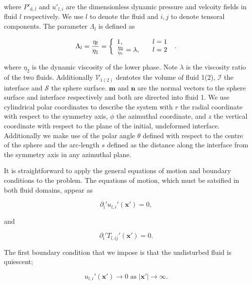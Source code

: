 \documentclass[12pt]{article}
\begin{document}
where $P'_{\text{d},l}$ and $u'_{l,i}$ are the dimensionless dynamic pressure and velcoity fields in fluid $l$ respectively. We use $l$ to denote the fluid and $i,j$ to denote tensoral components. The parameter $\Lambda_{l}$ is defined as

\begin{equation}
\label{equ:Llambda}
\Lambda_{l} = \frac{\eta_{l}}{\eta_{1}} = \left\{
    \begin{array}{l l}
      1, & \quad l = 1 \\
      \frac{\eta_{2}}{\eta_{1}} = \lambda, & \quad l = 2
    \end{array} \right.\ .
\end{equation}

where $\eta_{2}$ is the dynamic viscosity of the lower phase. Note $\lambda$ is the viscosity ratio of the two fluids. Additionally $\mathcal{V}_{1(2)}$ dentotes the volume of fluid 1(2), $\mathcal{I}$ the interface and $\mathcal{S}$ the sphere surface. $\boldsymbol{m}$ and $\boldsymbol{n}$ are the normal vectors to the sphere surface and interface respectively and both are directed into fluid 1. We use cylindrical polar coordinates to describe the system with $r$ the radial coordinate with respect to the symmetry axis, $\phi$ the azimuthal coordinate, and $z$ the vertical coordinate with respect to the plane of the initial, undeformed interface. Additionally we make use of the polar angle $\theta$ defined with respect to the centre of the sphere and the arc-length $s$ defined as the distance along the interface from the symmetry axis in any azimuthal plane.

It is straightforward to apply the general equations of motion and boundary conditions to the problem. The equations of motion, which must be satsified in both fluid domains, appear as 

\begin{equation}
\label{equ:cont}
\partial_{\text{i}}' u_{l,i}'(\boldsymbol{x'}) = 0,
\end{equation}

and 

\begin{equation}
\label{equ:stokes}
\partial_{\text{i}}' T_{l,ij}'(\boldsymbol{x'}) = 0.
\end{equation}

The first boundary condition that we impose is that the undisturbed fluid is quiescent;

\begin{equation}
\label{equ:BC_inf}
u_{l, i}'(\boldsymbol{x'}) \to 0 \text{ as } |\boldsymbol{x'}| \to \infty.
\end{equation}
\end{document}
